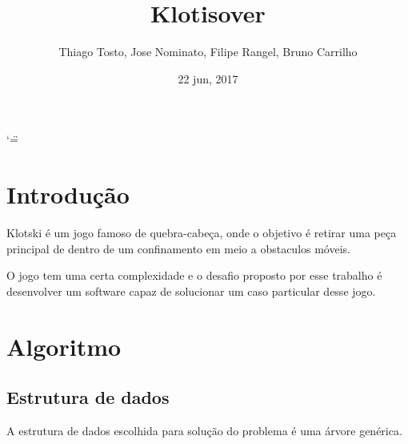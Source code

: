 \documentclass[letterpaper,10pt,openany,oneside,portuges]{sphinxmanual}
\title{Klotisover}
\date{22 jun, 2017}
\author{Thiago Tosto, Jose Nominato, Filipe Rangel, Bruno Carrilho}
\begin{document}
\ifnum\catcode`\"=\active{}\fi
\maketitle
\sphinxtableofcontents
{}\label{\detokenize{index::doc}}



\chapter{Introdução}
\label{\detokenize{intro:introducao}}\label{\detokenize{intro:bem-vindo-a-documentacao-do-klotisover}}\label{\detokenize{intro::doc}}
\begin{DUlineblock}{0em}
\item[] Klotski é um jogo famoso de quebra-cabeça, onde o objetivo é retirar uma peça principal de dentro de um confinamento em meio a obstaculos móveis.
\end{DUlineblock}


\begin{DUlineblock}{0em}
\item[] 
\item[] 
\end{DUlineblock}

\begin{DUlineblock}{0em}
\item[] O jogo tem uma certa complexidade e o desafio proposto por esse trabalho é desenvolver um software capaz de solucionar um caso particular desse jogo.
\end{DUlineblock}



\chapter{Algoritmo}
\label{\detokenize{algoritmo::doc}}\label{\detokenize{algoritmo:algoritmo}}

\section{Estrutura de dados}
\label{\detokenize{algoritmo:estrutura-de-dados}}
\begin{DUlineblock}{0em}
\item[] A estrutura de dados escolhida para solução do problema é uma árvore genérica.
\end{DUlineblock}
\end{document}
